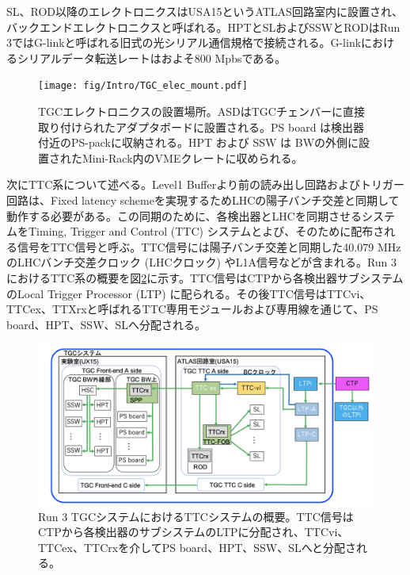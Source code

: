 SL、ROD以降のエレクトロニクスはUSA15というATLAS回路室内に設置され、バックエンドエレクトロニクスと呼ばれる。HPTとSLおよびSSWとRODはRun 3ではG-linkと呼ばれる旧式の光シリアル通信規格で接続される。G-linkにおけるシリアルデータ転送レートはおよそ800 Mpbsである。

\begin{figure} 
    \centering
    \texttt{[image: fig/Intro/TGC\_elec\_mount.pdf]}
    \caption[TGCエレクトロニクスが設置されている場所]{TGCエレクトロニクスの設置場所。ASDはTGCチェンバーに直接取り付けられたアダプタボードに設置される。PS board は検出器付近のPS-packに収納される。HPT および SSW は BWの外側に設置されたMini-Rack内のVMEクレートに収められる。}
    \label{TGC_elec_mount}
\end{figure}

次にTTC系について述べる。Level1 Bufferより前の読み出し回路およびトリガー回路は、Fixed latency schemeを実現するためLHCの陽子バンチ交差と同期して動作する必要がある。この同期のために、各検出器とLHCを同期させるシステムをTiming, Trigger and Control  (TTC) システムとよび、そのために配布される信号をTTC信号と呼ぶ。TTC信号には陽子バンチ交差と同期した40.079 MHzのLHCバンチ交差クロック  (LHCクロック) やL1A信号などが含まれる。Run 3におけるTTC系の概要を図\ref{Run3_TTC}に示す。TTC信号はCTPから各検出器サブシステムのLocal Trigger Processor  (LTP) に配られる。その後TTC信号はTTCvi、TTCex、TTXrxと呼ばれるTTC専用モジュールおよび専用線を通じて、PS board、HPT、SSW、SLへ分配される。

\begin{figure} 
\centering
\includegraphics[width=16cm]{fig/Intro/Run3_TTC.png}
\caption[Run 3 TGCシステムにおけるTTCシステムの概要]{Run 3 TGCシステムにおけるTTCシステムの概要\cite{JINST:2008}。TTC信号はCTPから各検出器のサブシステムのLTPに分配され、TTCvi、TTCex、TTCrxを介してPS board、HPT、SSW、SLへと分配される。}
\label{Run3_TTC}
\end{figure}

